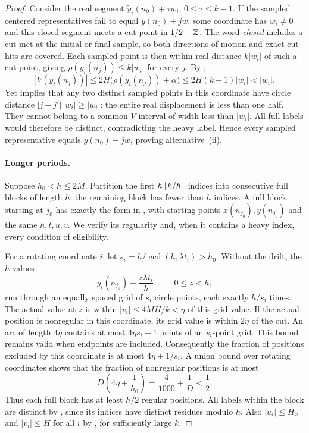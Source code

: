 \begin{proof}
Consider the real segment
$\tilde y_i(n_0)+\tau w_i$, $0\le\tau\le k-1$.
If the sampled centered representatives fail to equal
$\tilde y(n_0)+jw$, some coordinate has $w_i\ne0$ and this closed
segment meets a cut point in $1/2+\mathbb Z$. The word \emph{closed}
includes a cut met at the initial or final sample, so both directions
of motion and exact cut hits are covered. Each sampled point is
then within real distance $k|w_i|$ of such a cut point, giving
$\rho(y_i(n_j))\le k|w_i|$ for every $j$.
By ,
\[
 |V(y_i(n_j))|
 \le2H\bigl(\rho(y_i(n_j))+\alpha\bigr)
 \le2H(k+1)|w_i|<|w_i|.
\]
Yet  implies that any two distinct
sampled points in this coordinate have circle distance
$|j-j'|\,|w_i|\ge|w_i|$: the entire real displacement is less
than one half. They cannot belong to a common $V$ interval of width
less than $|w_i|$. All full labels would therefore be distinct,
contradicting the heavy label. Hence every sampled representative
equals $\tilde y(n_0)+jw$, proving alternative~\textup{(ii)}.

\paragraph{Longer periods.}
Suppose $h_0<h\le2M$. Partition the first
$h\left\lfloor k/h\right\rfloor$ indices into consecutive full blocks of length $h$;
the remaining block has fewer than $h$ indices. A full block starting
at $j_0$ has exactly the form in , with starting
points $x(n_{j_0}),y(n_{j_0})$ and the same $h,t,u,v$.
We verify its regularity and, when it contains a heavy index,
every condition of eligibility.

For a rotating coordinate $i$, let
$s_i=h/\gcd(h,\lambda t_i)>h_0$. Without the drift, the $h$
values
\[
 y_i(n_{j_0})+\frac{z\lambda t_i}{h},\qquad0\le z<h,
\]
run through an equally spaced grid of $s_i$ circle points, each
exactly $h/s_i$ times. The actual value at $z$ is within
$|v_i|\le4MH/k<\eta$ of this grid value. If the actual position is
nonregular in this coordinate, its grid value is within $2\eta$
of the cut. An arc of length $4\eta$ contains at most
$4\eta s_i+1$ points of an $s_i$-point grid. This bound remains
valid when endpoints are included. Consequently the fraction of
positions excluded by this coordinate is at most
$4\eta+1/s_i$. A union bound over rotating coordinates shows that
the fraction of nonregular positions is at most
\begin{equation}\label{dichotomy:regular-fraction}
 D\left(4\eta+\frac1{h_0}\right)
 =\frac4{1000}+\frac1D<\frac12.
\end{equation}
Thus each full block has at least $h/2$ regular positions. All labels
within the block are distinct by , since its
indices have distinct residues modulo $h$. Also
$|u_i|\le H_x$ and $|v_i|\le H$ for all $i$ by
, for sufficiently large $k$.


\end{proof}
